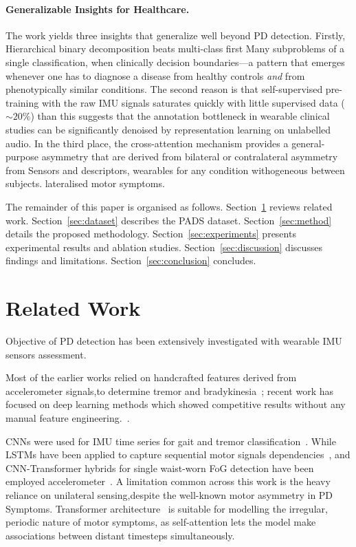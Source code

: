 \documentclass[pmlr]{jmlr}
\begin{document}
\paragraph{Generalizable Insights for Healthcare.}

The work yields three insights that generalize well beyond PD detection.
Firstly, Hierarchical binary decomposition beats multi-class first Many subproblems of a single classification, when clinically decision boundaries---a pattern that emerges whenever one has to diagnose a disease from healthy controls \emph{and} from phenotypically similar conditions. 
The second reason is that self-supervised pre-training with the raw IMU signals saturates quickly with little supervised data (${\sim}20\%$) than this suggests that the annotation bottleneck in wearable clinical studies can be significantly denoised by representation learning on unlabelled audio. 
In the third place, the cross-attention mechanism provides a general-purpose asymmetry that are derived from bilateral or contralateral asymmetry from Sensors and descriptors, wearables for any condition withogeneous between subjects. lateralised motor symptoms.

The remainder of this paper is organised as follows.
Section~\ref{sec:related} reviews related work.
Section~\ref{sec:dataset} describes the PADS dataset.
Section~\ref{sec:method} details the proposed methodology.
Section~\ref{sec:experiments} presents experimental results and
ablation studies.
Section~\ref{sec:discussion} discusses findings and limitations.
Section~\ref{sec:conclusion} concludes.


\section{Related Work}
\label{sec:related}
Objective of PD detection has been extensively investigated with wearable IMU sensors assessment.

Most of the earlier works relied on handcrafted features derived from accelerometer signals,to determine tremor and bradykinesia~\citep{patel2009}; recent work has focused on deep learning methods which showed competitive results without any manual feature engineering.~\cite{Jahanshahi et al. 2020}.

CNNs were used for IMU time series for gait and tremor classification~\citep{soumma2025fog}. While LSTMs have been applied to capture sequential motor signals dependencies~\citep{guo2022}, and CNN-Transformer hybrids for single waist-worn FoG detection have been employed accelerometer~\citep{sigcha2022}. A limitation common across this work is the heavy reliance on unilateral sensing,despite the well-known motor asymmetry in PD Symptoms.
Transformer architecture~\citep{vaswani2017} is suitable for modelling the irregular, periodic nature of motor symptoms, as self-attention lets the model make associations between distant timesteps simultaneously. 
\end{document}
